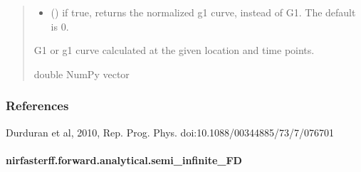\documentclass[letterpaper,10pt,english]{sphinxmanual}
\begin{document}
\begin{fulllineitems}
\begin{quote}
\begin{description}
\begin{itemize}
\item {} 
\sphinxAtStartPar
{} (\sphinxstyleliteralemphasis{\sphinxupquote{, }}) \textendash{} if true, returns the normalized g1 curve, instead of G1. The default is 0.

\end{itemize}

\sphinxAtStartPar
G1 or g1 curve calculated at the given location and time points.

\sphinxAtStartPar
double NumPy vector

\end{description}\end{quote}
\subsubsection*{References}

\sphinxAtStartPar
Durduran et al, 2010, Rep. Prog. Phys. doi:10.1088/0034\sphinxhyphen{}4885/73/7/076701

\end{fulllineitems}


\sphinxstepscope


\paragraph{nirfasterff.forward.analytical.semi\_infinite\_FD}
\label{\detokenize{_autosummary/nirfasterff.forward.analytical.semi_infinite_FD:nirfasterff-forward-analytical-semi-infinite-fd}}\label{\detokenize{_autosummary/nirfasterff.forward.analytical.semi_infinite_FD::doc}}
\end{document}
